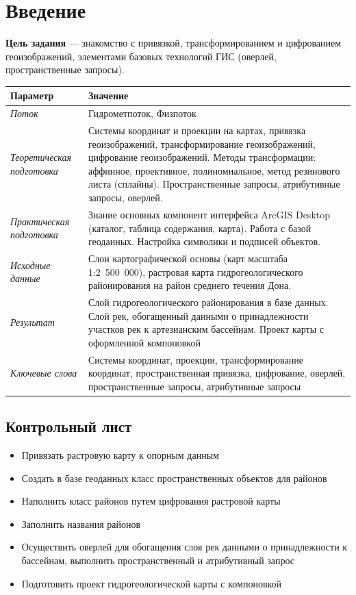 \documentclass[]{book}
\providecommand{\tightlist}{%
  \setlength{\itemsep}{0pt}\setlength{\parskip}{0pt}}
\theoremstyle{definition}
\theoremstyle{definition}
\theoremstyle{definition}
\theoremstyle{remark}
\begin{document}
\hypertarget{map-ref-hydrogeologic-intro}{%
\section{Введение}\label{map-ref-hydrogeologic-intro}}

\textbf{Цель задания} --- знакомство с привязкой, трансформированием и
цифрованием геоизображений, элементами базовых технологий ГИС (оверлей,
пространственные запросы).

\begin{longtable}[]{@{}ll@{}}
\toprule
Параметр & Значение\tabularnewline
\midrule
\endhead
\emph{Поток} & Гидрометпоток, Физпоток\tabularnewline
\emph{Теоретическая подготовка} & Системы координат и проекции на
картах, привязка геоизображений, трансформирование геоизображений,
цифрование геоизображений. Методы трансформации: аффинное, проективное,
полиномиальное, метод резинового листа (сплайны). Пространственные
запросы, атрибутивные запросы, оверлей.\tabularnewline
\emph{Практическая подготовка} & Знание основных компонент интерфейса
ArcGIS Desktop (каталог, таблица содержания, карта). Работа с базой
геоданных. Настройка символики и подписей объектов.\tabularnewline
\emph{Исходные данные} & Слои картографической основы (карт масштаба
1:2~500~000), растровая карта гидрогеологического районирования на район
среднего течения Дона.\tabularnewline
\emph{Результат} & Слой гидрогеологического районирования в базе данных.
Слой рек, обогащенный данными о принадлежности участков рек к
артезианским бассейнам. Проект карты с оформленной
компоновкой\tabularnewline
\emph{Ключевые слова} & Системы координат, проекции, трансформирование
координат, пространственная привязка, цифрование, оверлей,
пространственные запросы, атрибутивные запросы\tabularnewline
\bottomrule
\end{longtable}

\hypertarget{map-ref-hydrogeologic-control}{%
\subsection{Контрольный лист}\label{map-ref-hydrogeologic-control}}

\begin{itemize}
\tightlist
\item
  Привязать растровую карту к опорным данным
\item
  Создать в базе геоданных класс пространственных объектов для районов
\item
  Наполнить класс районов путем цифрования растровой карты
\item
  Заполнить названия районов
\item
  Осуществить оверлей для обогащения слоя рек данными о принадлежности к
  бассейнам, выполнить пространственный и атрибутивный запрос
\item
  Подготовить проект гидрогеологической карты с компоновкой
\end{itemize}
\end{document}
